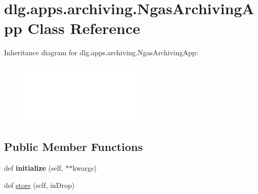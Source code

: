 \hypertarget{classdlg_1_1apps_1_1archiving_1_1_ngas_archiving_app}{}\section{dlg.\+apps.\+archiving.\+Ngas\+Archiving\+App Class Reference}
\label{classdlg_1_1apps_1_1archiving_1_1_ngas_archiving_app}
Inheritance diagram for dlg.\+apps.\+archiving.\+Ngas\+Archiving\+App\+:\begin{figure}[H]
\begin{center}
\leavevmode
\includegraphics[height=3.000000cm]{classdlg_1_1apps_1_1archiving_1_1_ngas_archiving_app}
\end{center}
\end{figure}
\subsection*{Public Member Functions}
\begin{DoxyCompactItemize}
\item 
\mbox{\label{classdlg_1_1apps_1_1archiving_1_1_ngas_archiving_app_a2667d1348a10028389c16a1d933a5702}} 
def {\bfseries initialize} (self, $\ast$$\ast$kwargs)
\item 
def \mbox{\hyperlink{classdlg_1_1apps_1_1archiving_1_1_ngas_archiving_app_a6823199a640bdd4c5991b8728d7af490}{store}} (self, in\+Drop)
\end{DoxyCompactItemize}
